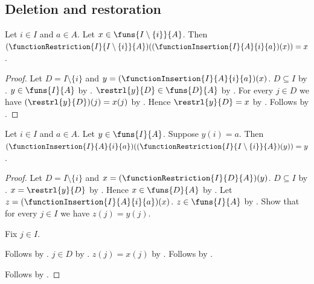 \subsection{Deletion and restoration}

\begin{theorem}\label{function_restriction_insertion_apply}
    Let $i\in I$ and $a\in A$.
    Let $x\in\funs{I\setminus\{i\}}{A}$.
    Then $(\functionRestriction{I}{I\setminus\{i\}}{A})(
        (\functionInsertion{I}{A}{i}{a})(x))=x$.
\end{theorem}
\begin{proof}
    Let $D=I\setminus\{i\}$ and $y=(\functionInsertion{I}{A}{i}{a})(x)$.
    $D\subseteq I$ by .
    $y\in\funs{I}{A}$ by .
    $\restrl{y}{D}\in\funs{D}{A}$ by .
    For every $j\in D$ we have $(\restrl{y}{D})(j)=x(j)$ by
        .
    Hence $\restrl{y}{D}=x$ by .
    Follows by .
\end{proof}

\begin{theorem}\label{function_insertion_restriction_apply}
    Let $i\in I$ and $a\in A$.
    Let $y\in\funs{I}{A}$.
    Suppose $y(i)=a$.
    Then $(\functionInsertion{I}{A}{i}{a})(
        (\functionRestriction{I}{I\setminus\{i\}}{A})(y))=y$.
\end{theorem}
\begin{proof}
    Let $D=I\setminus\{i\}$ and $x=(\functionRestriction{I}{D}{A})(y)$.
    $D\subseteq I$ by .
    $x=\restrl{y}{D}$ by .
    Hence $x\in\funs{D}{A}$ by .
    Let $z=(\functionInsertion{I}{A}{i}{a})(x)$.
    $z\in\funs{I}{A}$ by .
    Show that for every $j\in I$ we have $z(j)=y(j)$.
    \begin{subproof}
        Fix $j\in I$.
        \begin{byCase}
                Follows by .
                $j\in D$ by .
                $z(j)=x(j)$ by .
                Follows by .
        \end{byCase}
    \end{subproof}
    Follows by .
\end{proof}


